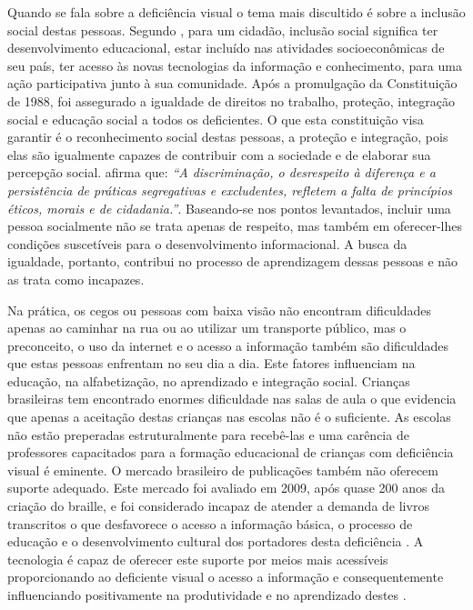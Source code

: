 Quando se fala sobre a deficiência visual o tema mais discultido é sobre a inclusão social destas pessoas. Segundo \cite{patricia}, para um cidadão, inclusão social significa ter desenvolvimento educacional, estar incluído nas atividades socioeconômicas de seu país, ter acesso às novas tecnologias da informação e conhecimento, para uma ação participativa junto à sua comunidade. Após a promulgação da Constituição de 1988, foi assegurado a igualdade de direitos no trabalho, proteção, integração social e educação social a todos os deficientes. O que esta constituição visa garantir é o reconhecimento social destas pessoas, a proteção e integração, pois elas são igualmente capazes de contribuir com a sociedade e de elaborar sua percepção social. \cite{matos} afirma que: \textit{``A discriminação, o desrespeito à diferença e a persistência de práticas segregativas e excludentes, refletem a falta de princípios éticos, morais e de cidadania.''}. Baseando-se nos pontos levantados, incluir uma pessoa socialmente não se trata apenas de respeito, mas também em oferecer-lhes condições suscetíveis para o desenvolvimento informacional. A busca da igualdade, portanto, contribui no processo de aprendizagem dessas pessoas e não as trata como incapazes. 

Na prática, os cegos ou pessoas com baixa visão não encontram dificuldades apenas ao caminhar na rua ou ao utilizar um transporte público, mas o preconceito, o uso da internet e o acesso a informação também são dificuldades que estas pessoas enfrentam no seu dia a dia. Este fatores influenciam na educação, na alfabetização, no aprendizado e integração social. Crianças brasileiras tem encontrado enormes dificuldade nas salas de aula o que evidencia que apenas a aceitação destas crianças nas escolas não é o suficiente. As escolas não estão preperadas estruturalmente para recebê-las e uma carência de professores capacitados para a formação educacional de crianças com deficiência visual é eminente. O mercado brasileiro de publicações também não oferecem suporte adequado. Este mercado foi avaliado em 2009, após quase 200 anos da criação do braille, e foi considerado incapaz de atender a demanda de livros transcritos o que desfavorece o acesso a informação básica, o processo de educação e o desenvolvimento cultural dos portadores desta deficiência \cite{escolasbrasileiras}. A tecnologia é capaz de oferecer este suporte por meios mais acessíveis proporcionando ao deficiente visual o acesso a informação e consequentemente influenciando positivamente na produtividade e no aprendizado destes \cite{revistaabc}.

